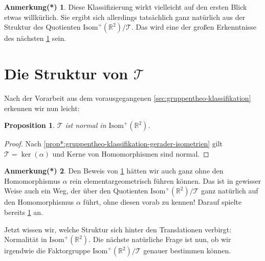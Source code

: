 \documentclass[a4paper, ngerman]{article}
\newcounter{chapter}
\numberwithin{equation}{chapter}
\theoremstyle{plain}
\newtheorem{proposition}{Proposition}[chapter]
\theoremstyle{definition}
\newtheorem{annotationstrd}{Anmerkung(*)}[chapter]
\newcommand{\geradisometr}{\ensuremath{\mathrm{Isom}^+(\mathbb R^2)}}
\begin{document}
\begin{annotationstrd}\label{ann*:alpha-ergibt-sich-aus-struktur}
    Diese Klassifizierung wirkt vielleicht auf den ersten Blick etwas will\-kür\-lich. Sie ergibt sich allerdings tatsächlich ganz natürlich aus der Struktur des Quotienten \(\mathrm{Isom}^+(\mathbb R^2) /\mathcal T\). Das wird eine der großen Erkenntnisse des nächsten \cref{sec:struktur-von-translationen} sein. 
\end{annotationstrd}

\section{Die Struktur von \(\mathcal T\)}\label{sec:struktur-von-translationen}

Nach der Vorarbeit aus dem vorausgegangenen \cref{sec:gruppentheo-klassifikation} erkennen wir nun leicht: 
\begin{proposition}\label{prop:normale-translationen}
    \(\mathcal T\) ist normal in \(\geradisometr\). 
\end{proposition}
\begin{proof}
    Nach \cref{prop*:gruppentheo-klassifikation-gerader-isometrien} gilt \(\mathcal T = \ker(\alpha)\) und Kerne von Homomorphismen sind normal. 
\end{proof}
\begin{annotationstrd}
    Den Beweis von \cref{prop:normale-translationen} hätten wir auch ganz ohne den Homomorphismus \(\alpha\) rein elementargeometrisch führen können. Das ist in gewisser Weise auch ein Weg, der über den Quotienten \(\geradisometr/\mathcal T\) ganz natürlich auf den Homomorphismus \(\alpha\) führt, ohne diesen vorab zu kennen! Darauf spielte bereits \cref{ann*:alpha-ergibt-sich-aus-struktur} an.
\end{annotationstrd}
\noindent Jetzt wissen wir, welche Struktur sich hinter den Translationen verbirgt: Normalität in \(\geradisometr\). Die nächste natürliche Frage ist nun, ob wir irgendwie die Faktorgruppe \(\geradisometr /\mathcal T\) genauer bestimmen können. 
\end{document}
